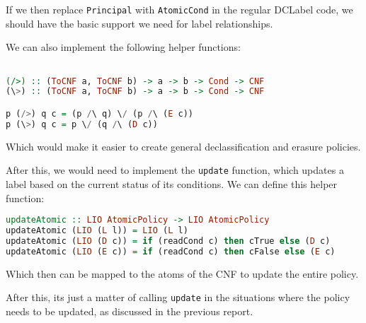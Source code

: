 \documentclass[11pt, oneside]{article}   	%
\begin{document}
If we then replace \texttt{Principal} with \texttt{AtomicCond} in the regular DCLabel code, we should have the basic support we need for label relationships.

We can also implement the following helper functions:

\begin{lstlisting}[language=Haskell]

(/>) :: (ToCNF a, ToCNF b) -> a -> b -> Cond -> CNF
(\>) :: (ToCNF a, ToCNF b) -> a -> b -> Cond -> CNF

p (/>) q c = (p /\ q) \/ (p /\ (E c))
p (\>) q c = p \/ (q /\ (D c))

\end{lstlisting}

Which would make it easier to create general declassification and erasure policies. 


After this, we would need to implement the \texttt{update} function, which updates a label based on the current status of its conditions. We can define this helper function:

\begin{lstlisting}[language=Haskell]
updateAtomic :: LIO AtomicPolicy -> LIO AtomicPolicy
updateAtomic (LIO (L l)) = LIO (L l)
updateAtomic (LIO (D c)) = if (readCond c) then cTrue else (D c)
updateAtomic (LIO (E c)) = if (readCond c) then cFalse else (E c)
\end{lstlisting}

Which then can be mapped to the atoms of the CNF to update the entire policy.

After this, its just a matter of calling \texttt{update} in the situations where the policy needs to be updated, as discussed in the previous report.


\end{document}
